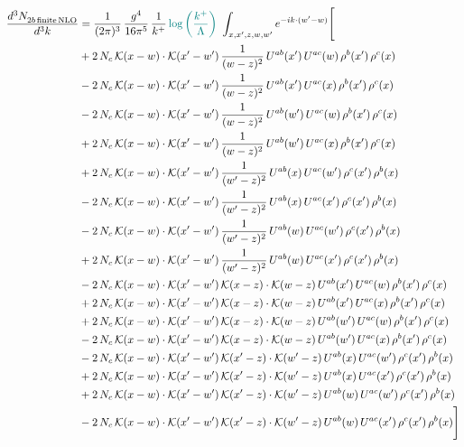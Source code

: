 \documentclass[9pt]{article}
\numberwithin{equation}{section}
\begin{document}
\begin{align}
\frac{d^{3}N_{2b\,\rm finite\, NLO}^{\rm}}{d^{3}k} & = \frac{1}{(2\pi)^{3}}\,\frac{g^{4}}{16\pi^{5}}\,\frac{1}{k^{+}}\,{\color{teal}\log{\left(\frac{k^{+}}{\Lambda}\right)}}\,\,\int_{x,x',z,w,w'}e^{-ik\cdot(w'-w)}\Bigg[\notag\\ & +2\,N_{c}\,\mathcal{K}(x-w)\cdot\mathcal{K}(x'-w')\,\frac{1}{(w-z)^{2}}\,U^{ab}(x')\,U^{ac}(w)\,\rho^{b}(x')\,\rho^{c}(x)\notag\\
&-2\,N_{c}\,\mathcal{K}(x-w)\cdot\mathcal{K}(x'-w')\,\frac{1}{(w-z)^{2}}\,U^{ab}(x')\,U^{ac}(x)\,\rho^{b}(x')\,\rho^{c}(x)\notag\\
&-2\,N_{c}\,\mathcal{K}(x-w)\cdot\mathcal{K}(x'-w')\,\frac{1}{(w-z)^{2}}\,U^{ab}(w')\,U^{ac}(w)\,\rho^{b}(x')\,\rho^{c}(x)\notag\\
&+2\,N_{c}\,\mathcal{K}(x-w)\cdot\mathcal{K}(x'-w')\,\frac{1}{(w-z)^{2}}\,U^{ab}(w')\,U^{ac}(x)\,\rho^{b}(x')\,\rho^{c}(x)\notag\\
&+2\,N_{c}\,\mathcal{K}(x-w)\cdot\mathcal{K}(x'-w')\,\frac{1}{(w'-z)^{2}}\,U^{ab}(x)\,U^{ac}(w')\,\rho^{c}(x')\,\rho^{b}(x)\notag\\
&-2\,N_{c}\,\mathcal{K}(x-w)\cdot\mathcal{K}(x'-w')\,\frac{1}{(w'-z)^{2}}\,U^{ab}(x)\,U^{ac}(x')\,\rho^{c}(x')\,\rho^{b}(x)\notag\\
&-2\,N_{c}\,\mathcal{K}(x-w)\cdot\mathcal{K}(x'-w')\,\frac{1}{(w'-z)^{2}}\,U^{ab}(w)\,U^{ac}(w')\,\rho^{c}(x')\,\rho^{b}(x)\notag\\
&+2\,N_{c}\,\mathcal{K}(x-w)\cdot\mathcal{K}(x'-w')\,\frac{1}{(w'-z)^{2}}\,U^{ab}(w)\,U^{ac}(x')\,\rho^{c}(x')\,\rho^{b}(x)\notag\\
&-2\,N_{c}\,\mathcal{K}(x-w)\cdot\mathcal{K}(x'-w')\,\mathcal{K}(x-z)\cdot\mathcal{K}(w-z)\,U^{ab}(x')\,U^{ac}(w)\,\rho^{b}(x')\,\rho^{c}(x)\notag\\
&+2\,N_{c}\,\mathcal{K}(x-w)\cdot\mathcal{K}(x'-w')\,\mathcal{K}(x-z)\cdot\mathcal{K}(w-z)\,U^{ab}(x')\,U^{ac}(x)\,\rho^{b}(x')\,\rho^{c}(x)\notag\\
&+2\,N_{c}\,\mathcal{K}(x-w)\cdot\mathcal{K}(x'-w')\,\mathcal{K}(x-z)\cdot\mathcal{K}(w-z)\,U^{ab}(w')\,U^{ac}(w)\,\rho^{b}(x')\,\rho^{c}(x)\notag\\
&-2\,N_{c}\,\mathcal{K}(x-w)\cdot\mathcal{K}(x'-w')\,\mathcal{K}(x-z)\cdot\mathcal{K}(w-z)\,U^{ab}(w')\,U^{ac}(x)\,\rho^{b}(x')\,\rho^{c}(x)\notag\\
&-2\,N_{c}\,\mathcal{K}(x-w)\cdot\mathcal{K}(x'-w')\,\mathcal{K}(x'-z)\cdot\mathcal{K}(w'-z)\,U^{ab}(x)\,U^{ac}(w')\,\rho^{c}(x')\,\rho^{b}(x)\notag\\
&+2\,N_{c}\,\mathcal{K}(x-w)\cdot\mathcal{K}(x'-w')\,\mathcal{K}(x'-z)\cdot\mathcal{K}(w'-z)\,U^{ab}(x)\,U^{ac}(x')\,\rho^{c}(x')\,\rho^{b}(x)\notag\\
&+2\,N_{c}\,\mathcal{K}(x-w)\cdot\mathcal{K}(x'-w')\,\mathcal{K}(x'-z)\cdot\mathcal{K}(w'-z)\,U^{ab}(w)\,U^{ac}(w')\,\rho^{c}(x')\,\rho^{b}(x)\notag\\
&-2\,N_{c}\,\mathcal{K}(x-w)\cdot\mathcal{K}(x'-w')\,\mathcal{K}(x'-z)\cdot\mathcal{K}(w'-z)\,U^{ab}(w)\,U^{ac}(x')\,\rho^{c}(x')\,\rho^{b}(x)\Bigg]
\end{align}
\end{document}
